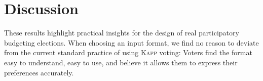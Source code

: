 \documentclass[letterpaper]{article} %
\newcommand{\kapp}{\textsc{Kapp}}
\newcommand{\mes}{ES}
\begin{document}














\section{Discussion}

These results highlight practical insights  for the design of real participatory budgeting elections. 
When choosing an input format, we find no reason to deviate from the current standard practice of  using \kapp{} voting: Voters find the format easy to understand, easy to  use, and believe it allows them to express their preferences accurately. 
\end{document}
